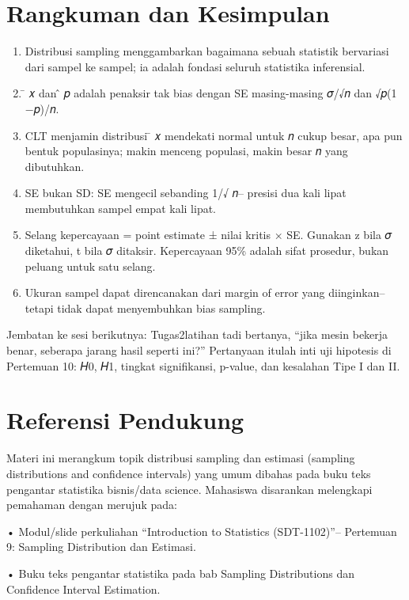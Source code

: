 \documentclass[
  indonesian,
  letterpaper,
]{book}
\begin{document}
\section{Rangkuman dan Kesimpulan}\label{rangkuman-dan-kesimpulan}

\begin{enumerate}
\def\labelenumi{\arabic{enumi}.}
\item
  Distribusi sampling menggambarkan bagaimana sebuah statistik
  bervariasi dari sampel ke sampel; ia adalah fondasi seluruh statistika
  inferensial.
\item
  ̄ 𝑥 dan ̂ 𝑝 adalah penaksir tak bias dengan SE masing-masing 𝜎/√𝑛 dan
  √𝑝(1 −𝑝)/𝑛.
\item
  CLT menjamin distribusi ̄ 𝑥 mendekati normal untuk 𝑛 cukup besar, apa
  pun bentuk populasinya; makin menceng populasi, makin besar 𝑛 yang
  dibutuhkan.
\item
  SE bukan SD: SE mengecil sebanding 1/√ 𝑛-- presisi dua kali lipat
  membutuhkan sampel empat kali lipat.
\item
  Selang kepercayaan = point estimate ± nilai kritis × SE. Gunakan z
  bila 𝜎 diketahui, t bila 𝜎 ditaksir. Kepercayaan 95\% adalah sifat
  prosedur, bukan peluang untuk satu selang.
\item
  Ukuran sampel dapat direncanakan dari margin of error yang
  diinginkan-- tetapi tidak dapat menyembuhkan bias sampling.
\end{enumerate}

Jembatan ke sesi berikutnya: Tugas2latihan tadi bertanya, ``jika mesin
bekerja benar, seberapa jarang hasil seperti ini?'' Pertanyaan itulah
inti uji hipotesis di Pertemuan 10: 𝐻0, 𝐻1, tingkat signifikansi,
p-value, dan kesalahan Tipe I dan II.

\section{Referensi Pendukung}\label{referensi-pendukung}

Materi ini merangkum topik distribusi sampling dan estimasi (sampling
distributions and confidence intervals) yang umum dibahas pada buku teks
pengantar statistika bisnis/data science. Mahasiswa disarankan
melengkapi pemahaman dengan merujuk pada:

• Modul/slide perkuliahan ``Introduction to Statistics (SDT-1102)''--
Pertemuan 9: Sampling Distribution dan Estimasi.

• Buku teks pengantar statistika pada bab Sampling Distributions dan
Confidence Interval Estimation.
\end{document}
